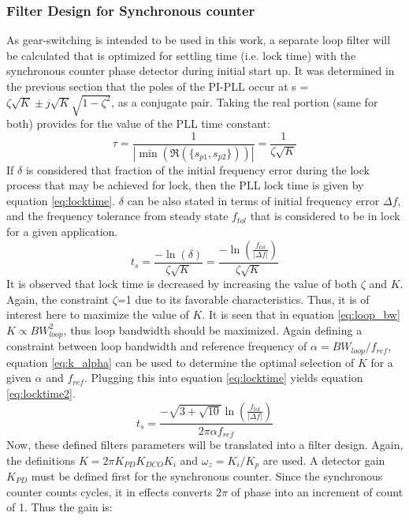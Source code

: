 	\FloatBarrier

		\subsubsection{Filter Design for Synchronous counter}
			As gear-switching is intended to be used in this work, a separate loop filter will be calculated that is optimized for settling time (i.e. lock time) with the synchronous counter phase detector during initial start up. It was determined in the previous section that the poles of the PI-PLL occur at s = $\zeta\sqrt{K} \pm j\sqrt{K}\sqrt{1-\zeta^2}$, as a conjugate pair. Taking the real portion (same for both) provides for the value of the PLL time constant:
			\begin{equation}
				\tau = \frac{1}{|\min(\Re(\{s_{p1}, s_{p2}\}))|} = \frac{1}{\zeta\sqrt{K}}
			\end{equation}
			If $\delta$ is considered that fraction of the initial frequency error during the lock process that may be achieved for lock, then the PLL lock time is given by equation \ref{eq:locktime}. $\delta$ can be also stated in terms of initial frequency error $\Delta f$, and the frequency tolerance from steady state $f_{tol}$ that is considered to be in lock for a given application.
			\begin{equation}\label{eq:locktime}
				t_s = \frac{-\ln(\delta)}{\zeta\sqrt{K}} = \frac{-\ln\left(\frac{f_{tol}}{|\Delta f|}\right)}{\zeta\sqrt{K}}
			\end{equation}
			It is observed that lock time is decreased by increasing the value of both $\zeta$ and $K$. Again, the constraint $\zeta$=1 due to its favorable characteristics. Thus, it is of interest here to maximize the value of $K$. It is seen that in equation \ref{eq:loop_bw} $K\propto BW_{loop}^2$, thus loop bandwidth should be maximized. Again defining a constraint between loop bandwidth and reference frequency of $\alpha = BW_{loop}/f_{ref}$, equation \ref{eq:k_alpha} can be used to determine the optimal selection of $K$ for a given $\alpha$ and $f_{ref}$. Plugging this into equation \ref{eq:locktime} yields equation \ref{eq:locktime2}.
			\begin{equation}\label{eq:locktime2}
				t_s =  \frac{-\sqrt{3+\sqrt{10}}\ln\left(\frac{f_{tol}}{|\Delta f|}\right)}{2\pi\alpha f_{ref}}
			\end{equation}
			Now, these defined filters parameters will be translated into a filter design. Again, the definitions $K=2\pi K_{PD}K_{DCO}K_{i}$ and $\omega_z = K_i/K_p$ are used. A detector gain $K_{PD}$ must be defined first for the synchronous counter. Since the synchronous counter counts cycles, it in effects converts $2\pi$ of phase into an increment of count of 1. Thus the gain is:
